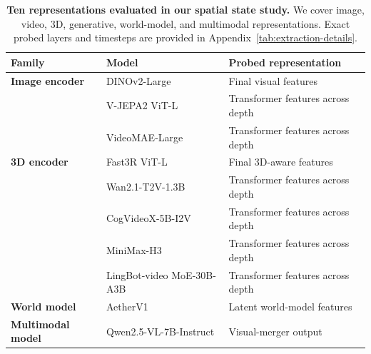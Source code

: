 \documentclass{article} %
\renewcommand{\arraystretch}{1.12}
\begin{document}
\begin{table}[t]
  \centering
  \small
  \setlength{\tabcolsep}{6pt}
  \renewcommand{\arraystretch}{1.12}

  \begin{tabularx}{\textwidth}{
    @{}
    >{\raggedright\arraybackslash}p{}
    >{\raggedright\arraybackslash}p{}
    >{\raggedright\arraybackslash}X
    @{}
  }
    \toprule
    \rowcolor{morandiheader}
    \textbf{Family} &
    \textbf{Model} &
    \textbf{Probed representation} \\
    \midrule

    \textbf{Image encoder}
      & DINOv2-Large
      & Final visual features \\

    \cmidrule(lr){1-3}

    \multirow{2}{*}{\textbf{Video encoder}}
      & V-JEPA2 ViT-L
      & Transformer features across depth \\
      & VideoMAE-Large
      & Transformer features across depth \\

    \cmidrule(lr){1-3}

    \textbf{3D encoder}
      & Fast3R ViT-L
      & Final 3D-aware features \\

    \cmidrule(lr){1-3}

    \multirow{4}{*}{\textbf{Video generator}}
      & Wan2.1-T2V-1.3B
      & Transformer features across depth \\
      & CogVideoX-5B-I2V
      & Transformer features across depth \\
      & MiniMax-H3
      & Transformer features across depth \\
      & LingBot-video MoE-30B-A3B
      & Transformer features across depth \\

    \cmidrule(lr){1-3}

    \textbf{World model}
      & AetherV1
      & Latent world-model features \\

    \cmidrule(lr){1-3}

    \textbf{Multimodal model}
      & Qwen2.5-VL-7B-Instruct
      & Visual-merger output \\

    \bottomrule
  \end{tabularx}

  \caption{\textbf{Ten representations evaluated in our spatial state study.}
  We cover image, video, 3D, generative, world-model, and multimodal
  representations. Exact probed layers and timesteps are provided in Appendix~\ref{tab:extraction-details}.}
  \label{tab:model-overview}
\end{table}
\end{document}
